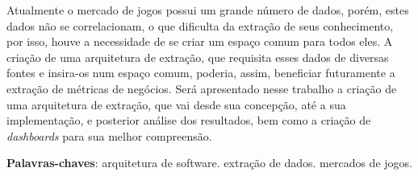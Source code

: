 \begin{resumo}

Atualmente o mercado de jogos possui um grande número de dados, porém, estes dados não se correlacionam, o que dificulta da extração de seus conhecimento, por isso, houve a necessidade de se criar um espaço comum para todos eles. A criação de uma arquitetura de extração, que requisita esses dados de diversas fontes e insira-os num espaço comum, poderia, assim, beneficiar futuramente a extração de métricas de negócios. Será apresentado nesse trabalho a criação de uma arquitetura de extração, que vai desde sua concepção, até a sua implementação, e posterior análise dos resultados, bem como a criação de \textit{dashboards} para sua melhor compreensão.

\vspace{\onelineskip}
    
\noindent
\textbf{Palavras-chaves}: arquitetura de software. extração de dados. mercados de jogos.
\end{resumo}

